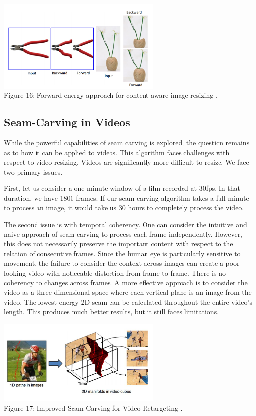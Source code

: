 \documentclass{article}
\begin{document}
\begin{center}
\includegraphics[width=8cm]{forward_energy.PNG} \\
Figure 16: Forward energy approach for content-aware image resizing \cite{avidan2007seam}.
\end{center}

\subsection{Seam-Carving in Videos}
While the powerful capabilities of seam carving is explored, the question remains as to how it can be applied to videos. This algorithm faces challenges with respect to video resizing. Videos are significantly more difficult to resize. We face two primary issues.

First, let us consider a one-minute window of a film recorded at 30fps. In that duration, we have 1800 frames. If our seam carving algorithm takes a full minute to process an image, it would take us 30 hours to completely process the video.

The second issue is with temporal coherency. One can consider the intuitive and naive approach of seam carving to process each frame independently. However, this does not necessarily preserve the important content with respect to the relation of consecutive frames. Since the human eye is particularly sensitive to movement, the failure to consider the context across images can create a poor looking video with noticeable distortion from frame to frame. There is no coherency to changes across frames. A more effective approach is to consider the video as a three dimensional space where each vertical plane is an image from the video. The lowest energy 2D seam can be calculated throughout the entire video's length. This produces much better results, but it still faces limitations.
\begin{center}
\includegraphics[width=8cm]{video_retargeting.JPG} \\
Figure 17: Improved Seam Carving for Video Retargeting \cite{rubinstein2008improved}.
\end{center}
\end{document}

